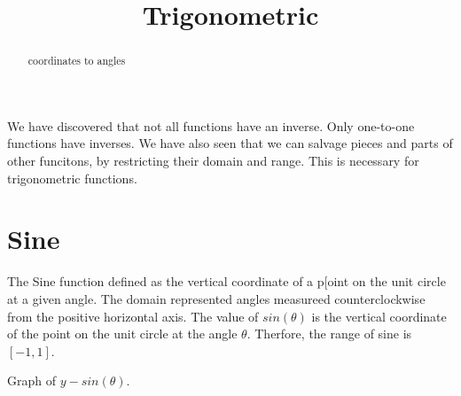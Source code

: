 \documentclass{ximera}
\title{Trigonometric}
\begin{document}
\begin{abstract}
coordinates to angles
\end{abstract}
\maketitle



We have discovered that not all functions have an inverse.  Only one-to-one functions have inverses.  We have also seen that we can salvage pieces and parts of other funcitons, by restricting their domain and range.  This is necessary for trigonometric functions.





\section{Sine}

The Sine function defined as the vertical coordinate of a p[oint on the unit circle at a given angle.  The domain represented angles measureed counterclockwise from the positive horizontal axis. The value of $sin(\theta)$ is the vertical coordinate of the point on the unit circle at the angle $\theta$. Therfore, the range of sine is $[-1, 1]$.


Graph of $y - sin(\theta)$.

\begin{image}
\end{image}
\end{document}
